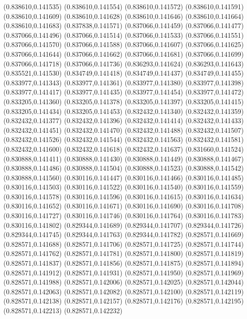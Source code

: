 (0.838610,0.141535)
(0.838610,0.141554)
(0.838610,0.141572)
(0.838610,0.141591)
(0.838610,0.141609)
(0.838610,0.141628)
(0.838610,0.141646)
(0.838610,0.141664)
(0.838610,0.141683)
(0.837838,0.141571)
(0.837066,0.141459)
(0.837066,0.141477)
(0.837066,0.141496)
(0.837066,0.141514)
(0.837066,0.141533)
(0.837066,0.141551)
(0.837066,0.141570)
(0.837066,0.141588)
(0.837066,0.141607)
(0.837066,0.141625)
(0.837066,0.141644)
(0.837066,0.141662)
(0.837066,0.141681)
(0.837066,0.141699)
(0.837066,0.141718)
(0.837066,0.141736)
(0.836293,0.141624)
(0.836293,0.141643)
(0.835521,0.141530)
(0.834749,0.141418)
(0.834749,0.141437)
(0.834749,0.141455)
(0.833977,0.141343)
(0.833977,0.141361)
(0.833977,0.141380)
(0.833977,0.141398)
(0.833977,0.141417)
(0.833977,0.141435)
(0.833977,0.141454)
(0.833977,0.141472)
(0.833205,0.141360)
(0.833205,0.141378)
(0.833205,0.141397)
(0.833205,0.141415)
(0.833205,0.141434)
(0.833205,0.141453)
(0.832432,0.141340)
(0.832432,0.141359)
(0.832432,0.141377)
(0.832432,0.141396)
(0.832432,0.141414)
(0.832432,0.141433)
(0.832432,0.141451)
(0.832432,0.141470)
(0.832432,0.141488)
(0.832432,0.141507)
(0.832432,0.141526)
(0.832432,0.141544)
(0.832432,0.141563)
(0.832432,0.141581)
(0.832432,0.141600)
(0.832432,0.141618)
(0.832432,0.141637)
(0.831660,0.141524)
(0.830888,0.141411)
(0.830888,0.141430)
(0.830888,0.141449)
(0.830888,0.141467)
(0.830888,0.141486)
(0.830888,0.141504)
(0.830888,0.141523)
(0.830888,0.141542)
(0.830888,0.141560)
(0.830116,0.141447)
(0.830116,0.141466)
(0.830116,0.141485)
(0.830116,0.141503)
(0.830116,0.141522)
(0.830116,0.141540)
(0.830116,0.141559)
(0.830116,0.141578)
(0.830116,0.141596)
(0.830116,0.141615)
(0.830116,0.141634)
(0.830116,0.141652)
(0.830116,0.141671)
(0.830116,0.141690)
(0.830116,0.141708)
(0.830116,0.141727)
(0.830116,0.141746)
(0.830116,0.141764)
(0.830116,0.141783)
(0.830116,0.141802)
(0.829344,0.141689)
(0.829344,0.141707)
(0.829344,0.141726)
(0.829344,0.141745)
(0.829344,0.141763)
(0.829344,0.141782)
(0.828571,0.141669)
(0.828571,0.141688)
(0.828571,0.141706)
(0.828571,0.141725)
(0.828571,0.141744)
(0.828571,0.141762)
(0.828571,0.141781)
(0.828571,0.141800)
(0.828571,0.141819)
(0.828571,0.141837)
(0.828571,0.141856)
(0.828571,0.141875)
(0.828571,0.141894)
(0.828571,0.141912)
(0.828571,0.141931)
(0.828571,0.141950)
(0.828571,0.141969)
(0.828571,0.141988)
(0.828571,0.142006)
(0.828571,0.142025)
(0.828571,0.142044)
(0.828571,0.142063)
(0.828571,0.142082)
(0.828571,0.142100)
(0.828571,0.142119)
(0.828571,0.142138)
(0.828571,0.142157)
(0.828571,0.142176)
(0.828571,0.142195)
(0.828571,0.142213)
(0.828571,0.142232)
